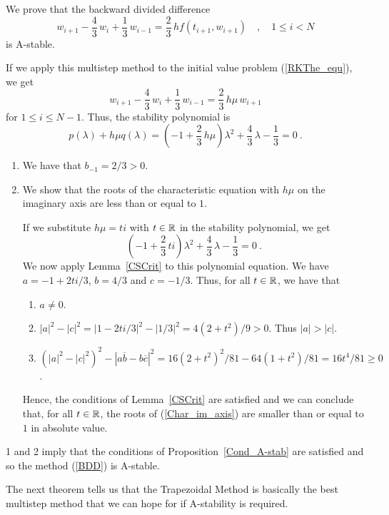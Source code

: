 \begin{egg}
We prove that the backward divided difference
\begin{equation} \label{BDD}
w_{i+1} - \frac{4}{3}\,w_i +\frac{1}{3}\,w_{i-1} =
\frac{2}{3}\,hf(t_{i+1},w_{i+1}) \quad , \quad 1 \leq i < N
\end{equation}
is A-stable.

If we apply this multistep method to the initial value problem
(\ref{RKThe_equ}), we get
\[
w_{i+1} - \frac{4}{3}\,w_i +\frac{1}{3}\,w_{i-1} =
\frac{2}{3}\,h\mu\,w_{i+1}
\]
for $1 \leq i \leq N-1$.  Thus, the stability polynomial is
\[
p(\lambda) + h\mu q(\lambda) = \left(-1+\frac{2}{3}\,h\mu \right) \lambda^2 +
\frac{4}{3}\,\lambda - \frac{1}{3}= 0 \ .
\]
\begin{enumerate}
\item We have that $b_{-1} = 2/3 > 0$.
\item We show that the roots of the characteristic equation with
$h\mu$ on the imaginary axis are less than or equal to $1$.

If we substitute $h\mu = ti$ with $t \in \mathbb{R}$ in the
stability polynomial, we get
\begin{equation} \label{Char_im_axis}
\left(-1+\frac{2}{3}\,ti \right) \lambda^2 + \frac{4}{3}\,\lambda
- \frac{1}{3}= 0 \ .
\end{equation}
We now apply Lemma~\ref{CSCrit} to this polynomial equation.   We
have $a = -1+2 ti/3$, $b=4/3$ and $c=-1/3$.  Thus, for all $t \in \mathbb{R}$,
we have that
\begin{enumerate}
\item $a \not= 0$.
\item $|a|^2 - |c|^2 = |1-2 ti/3|^2 - |1/3|^2 =
4(2+t^2)/9 > 0 $.  Thus $|a| > |c|$.
\item $\left( |a|^2 - |c|^2 \right)^2
-|a\overline{b}-b\overline{c}|^2 = 16(2+t^2)^2/81
-64(1+t^2)/81 = 16 t^4/81 \geq 0$.
\end{enumerate}
Hence, the conditions of Lemma~\ref{CSCrit} are satisfied and we can
conclude that, for all $t\in\mathbb{R}$, the roots of (\ref{Char_im_axis}) are
smaller than or equal to $1$ in absolute value.
\end{enumerate}
1 and 2 imply that the conditions of Proposition~\ref{Cond_A-stab}
are satisfied and so the method (\ref{BDD}) is A-stable.
\end{egg}

The next theorem tells us that the Trapezoidal Method is basically the
best multistep method that we can hope for if A-stability is required.

